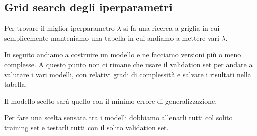 \subsection{Grid search degli iperparametri}
Per trovare il miglior iperparametro $\lambda$ si fa una ricerca a griglia in cui semplicemente manteniamo una tabella
in cui andiamo a mettere vari $\lambda$.

In seguito andiamo a costruire un modello e ne facciamo versioni pi\`u o meno complesse. A questo punto non ci rimane che
usare il validation set per andare a valutare i vari modelli, con relativi gradi di complessit\`a e salvare i risultati
nella tabella.

Il modello scelto sar\`a quello con il minimo errore di generalizzazione.

Per fare una scelta sensata tra i modelli dobbiamo allenarli tutti col solito training set e testarli tutti con il solito
validation set.